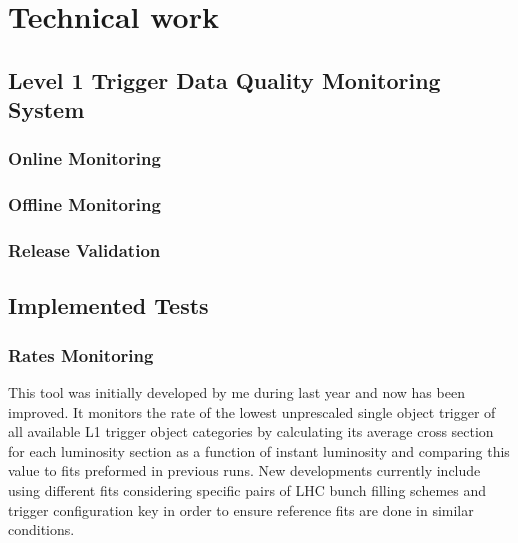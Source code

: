 \chapter{Technical work}

\section{Level 1 Trigger Data Quality Monitoring System}

\subsection{Online Monitoring}

\subsection{Offline Monitoring}

\subsection{Release Validation}

\section{Implemented Tests}

\subsection{Rates Monitoring}

This tool was initially developed by me during last year and now has been improved. It monitors the rate of the
lowest unprescaled single object trigger of all available L1 trigger object categories by calculating its
average cross section for each luminosity section as a function of instant luminosity and comparing this value to
fits preformed in previous runs. New developments currently include using different fits considering specific pairs of
LHC bunch filling schemes and trigger configuration key in order to ensure reference fits are done in similar conditions.


